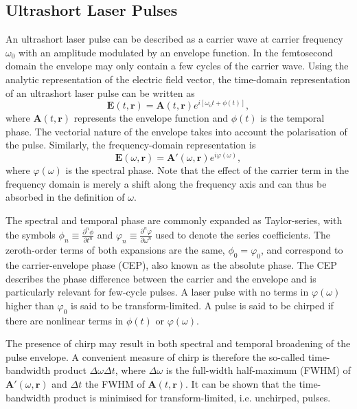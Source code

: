 \documentclass[a4paper]{jpconf}
\begin{document}
\subsection{Ultrashort Laser Pulses}
An ultrashort laser pulse can be described as a carrier wave at carrier frequency $\omega_0$ with an amplitude modulated by an envelope function. In the femtosecond domain the envelope may only contain a few cycles of the carrier wave. Using the analytic representation of the electric field vector, the time-domain representation of an ultrashort laser pulse can be written as 
\begin{equation}
\mathbf{E}(t, \mathbf{r}) = \mathbf{A}(t, \mathbf{r}) e^{i[ \omega_o t + \phi(t)]},
\end{equation}
where $\mathbf{A}(t, \mathbf{r})$ represents the envelope function and $\phi(t)$ is the temporal phase. The vectorial nature of the envelope takes into account the polarisation of the pulse. Similarly, the frequency-domain representation is 
\begin{equation}
\mathbf{E}(\omega, \mathbf{r}) = \mathbf{A}'(\omega, \mathbf{r}) e^{i \varphi(\omega)},
\end{equation}
where $\varphi(\omega)$ is the spectral phase. Note that the effect of the carrier term in the frequency domain is merely a shift along the frequency axis and can thus be absorbed in the definition of $\omega$. \par 
The spectral and temporal phase are commonly expanded as Taylor-series, with the symbols $\phi_n \equiv \frac{\partial^n \phi}{\partial t^n}$ and $\varphi_n \equiv \frac{\partial^n \varphi}{\partial \omega^n}$ used to denote the series coefficients. The zeroth-order terms of both expansions are the same, $\phi_0 = \varphi_0$, and correspond to the carrier-envelope phase (CEP), also known as the absolute phase. The CEP describes the phase difference between the carrier and the envelope and is particularly relevant for few-cycle pulses. A laser pulse with no terms in $\varphi(\omega)$ higher than $\varphi_0$ is said to be transform-limited. A pulse is said to be chirped if there are nonlinear terms in $\phi(t)$ or $\varphi(\omega)$. \par 
The presence of chirp may result in both spectral and temporal broadening of the pulse envelope. A convenient measure of chirp is therefore the so-called time-bandwidth product $\Delta \omega \Delta t$, where $\Delta \omega$ is the full-width half-maximum (FWHM) of $\mathbf{A}'(\omega, \mathbf{r})$ and $\Delta t$ the FWHM of $\mathbf{A}(t, \mathbf{r})$. It can be shown that the time-bandwidth product is minimised for transform-limited, i.e. unchirped, pulses. \par 
\end{document}
